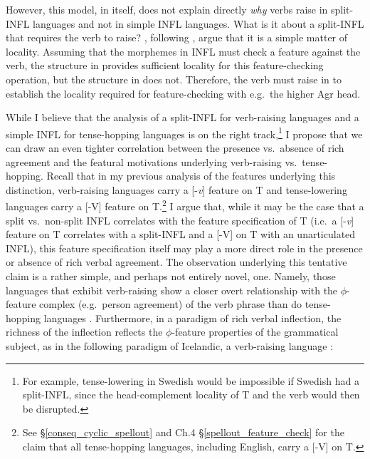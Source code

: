 However, this model, in itself, does not explain directly {\it why} verbs raise in split-INFL languages and not in simple INFL languages. What is it about a split-INFL that requires the verb to raise? \citet{bobaljik_thrainsson1998}, following \citet{bobaljik1995}, argue that it is a simple matter of locality. Assuming that the morphemes in INFL must check a feature against the verb, the structure in \Last[a] provides sufficient locality for this feature-checking operation, but the structure in \Last[b] does not. Therefore, the verb must raise in \Last[b] to establish the locality required for feature-checking with e.g.\ the higher Agr head.

While I believe that the analysis of a split-INFL for verb-raising languages and a simple INFL for tense-hopping languages is on the right track,\footnote{For example, tense-lowering in Swedish would be impossible if Swedish had a split-INFL, since the head-complement locality of T and the verb would then be disrupted.} I propose that we can draw an even tighter correlation between the presence vs.\ absence of rich agreement and the featural motivations underlying verb-raising vs.\ tense-hopping. Recall that in my previous analysis of the features underlying this distinction, verb-raising languages carry a [-{\it v}] feature on T and tense-lowering languages carry a [-V] feature on T.\footnote{See \S\ref{conseq_cyclic_spellout} and Ch.4 \S\ref{spellout_feature_check} for the claim that all tense-hopping languages, including English, carry a [-V] on T.} I argue that, while it may be the case that a split vs.\ non-split INFL correlates with the feature specification of T (i.e.\ a [-{\it v}] feature on T correlates with a split-INFL and a [-V] on T with an unarticulated INFL), this feature specification itself may play a more direct role in the presence or absence of rich verbal agreement. The observation underlying this tentative claim is a rather simple, and perhaps not entirely novel, one. Namely, those languages that exhibit verb-raising show a closer overt relationship with the $\phi$-feature complex (e.g.\ person agreement) of the verb phrase than do tense-hopping languages \citep{chomsky1995}. Furthermore, in a paradigm of rich verbal inflection, the richness of the inflection reflects the $\phi$-feature properties of the grammatical subject, as in the following paradigm of Icelandic, a verb-raising language \citep{bobaljik2000b}:

